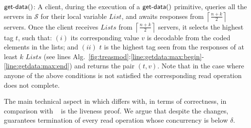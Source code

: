 $\dagetdata{c}$:	A  client, during the execution of a  $\dagetdata{c}$ primitive, queries all the servers in $\mathcal{S}$ for their  local variable $List$, and awaits responses from $\left\lceil \frac{n+k}{2} \right\rceil$ servers. Once the client receives $Lists$ from $\left\lceil \frac{n+k}{2} \right\rceil$ servers,  it selects the highest  tag $t$, such that: $(i)$ its corresponding value $v$ is decodable from the coded elements in the lists; and $(ii)$ $t$ is the highest tag seen from the responses of at least $k$ $Lists$ 
(see lines Alg.~\ref{fig:treasmod}:\ref{line:getdata:max:begin}-\ref{line:getdata:max:end}) and returns the pair $(t, v)$. 
Note that in the case where anyone of the above conditions is not satisfied the corresponding read operation does not complete.

The main technical aspect in which {\treasmod} differs with, in terms of correctness, in comparison with ~\treas{} is the liveness proof. We argue that despite the changes, {\treasmod} guarantees termination of every read operation whose concurrency is below $\delta$.

